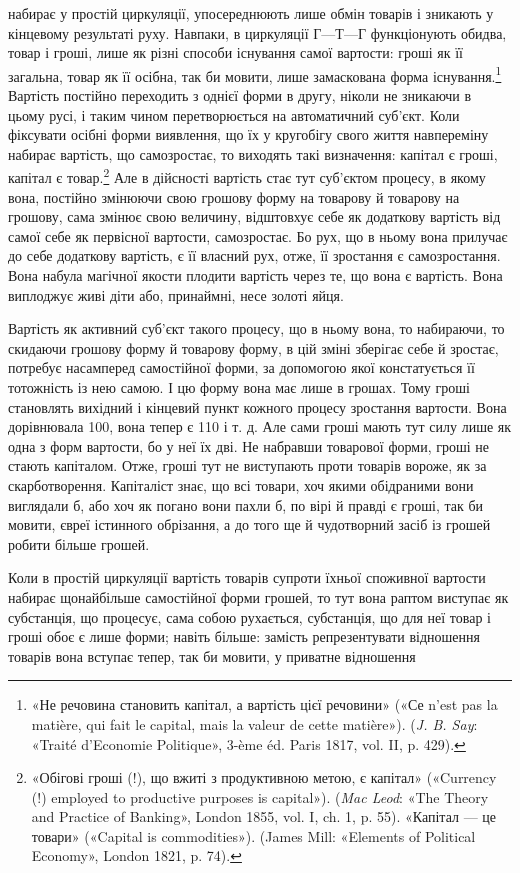 \parcont{}  %
набирає у простій циркуляції, упосереднюють лише обмін товарів
і зникають у кінцевому результаті руху. Навпаки, в циркуляції
$Г — Т — Г$ функціонують обидва, товар і гроші, лише як різні
способи існування самої вартости: гроші як її загальна, товар
як її осібна, так би мовити, лише замаскована форма існування.\footnote{
«Не речовина становить капітал, а вартість цієї речовини» («Се
n’est pas la matière, qui fait le capital, mais la valeur de cette matière»).
(\emph{J. B. Say}: «Traité d’Economie Politique», 3-ème éd. Paris 1817, vol. II,
p. 429).
}
Вартість постійно переходить з однієї форми в другу, ніколи не
зникаючи в цьому русі, і таким чином перетворюється на автоматичний
суб’єкт. Коли фіксувати осібні форми виявлення, що
їх у кругобігу свого життя навпереміну набирає вартість, що
самозростає, то виходять такі визначення: капітал є гроші, капітал
є товар.\footnote{
«Обігові гроші (!), що вжиті з продуктивною метою, є капітал»
(«Currency (!) employed to productive purposes is capital»). (\emph{Mac Leod}:
«The Theory and Practice of Banking», London 1855, vol. I, ch. 1, p. 55).
«Капітал — це товари» («Capital is commodities»). (James Mill: «Elements
of Political Economy», London 1821, p. 74).
} Але в дійсності вартість стає тут суб’єктом процесу,
в якому вона, постійно змінюючи свою грошову форму на товарову
й товарову на грошову, сама змінює свою величину, відштовхує
себе як додаткову вартість від самої себе як первісної
вартости, самозростає. Бо рух, що в ньому вона прилучає до себе
додаткову вартість, є її власний рух, отже, її зростання є самозростання.
Вона набула магічної якости плодити вартість через
те, що вона є вартість. Вона виплоджує живі діти або, принаймні,
несе золоті яйця.

Вартість як активний суб’єкт такого процесу, що в ньому
вона, то набираючи, то скидаючи грошову форму й товарову
форму, в цій зміні зберігає себе й зростає, потребує насамперед
самостійної форми, за допомогою якої констатується її тотожність
із нею самою. І цю форму вона має лише в грошах. Тому гроші
становлять вихідний і кінцевий пункт кожного процесу зростання
вартости. Вона дорівнювала 100, вона тепер
є 110 і т. д. Але сами гроші мають тут силу
лише як одна з форм вартости, бо у неї їх дві. Не набравши товарової
форми, гроші не стають капіталом. Отже, гроші тут не виступають
проти товарів вороже, як за скарботворення. Капіталіст
знає, що всі товари, хоч якими обідраними вони виглядали б,
або хоч як погано вони пахли б, по вірі й правді є гроші, так би
мовити, євреї істинного обрізання, а до того ще й чудотворний
засіб із грошей робити більше грошей.

Коли в простій циркуляції вартість товарів супроти їхньої
споживної вартости набирає щонайбільше самостійної форми
грошей, то тут вона раптом виступає як субстанція, що процесує,
сама собою рухається, субстанція, що для неї товар і гроші обоє
є лише форми; навіть більше: замість репрезентувати відношення
товарів вона вступає тепер, так би мовити, у приватне відношення
\parbreak{}  %
